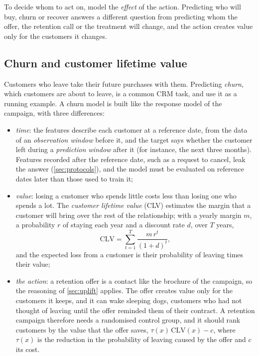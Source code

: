 \begin{keyidea}
To decide whom to act on, model the \emph{effect} of the action. Predicting who will buy, churn or recover
answers a different question from predicting whom the offer, the retention call or the treatment will change, and the action creates value only for the customers it changes.
\end{keyidea}

\subsection{Churn and customer lifetime value\extsec}\label{sec:churn}

Customers who leave take their future purchases with them. Predicting \emph{churn},
which customers are about to leave, is a common CRM task,
and \citet{provost2013data} use it as a running example. A churn model is built like the response model
of the campaign, with three differences:
\begin{itemize}
\item \emph{time}: the features describe each customer at a reference date, from the data of an
\emph{observation window} before it, and the target says whether the customer left during a
\emph{prediction window} after it (for instance, the next three months). Features recorded after the
reference date, such as a request to cancel, leak the answer (\cref{sec:protocols}), and the model must
be evaluated on reference dates later than those used to train it;
\item \emph{value}: losing a customer who spends little costs less than losing one who spends a lot.
The \emph{customer lifetime value} (CLV) estimates the margin that
a customer will bring over the rest of the relationship; with a yearly margin $m$, a probability $r$ of
staying each year and a discount rate $d$, over $T$ years,
\begin{equation}\label{eq:clv}
\mathrm{CLV}=\sum_{t=1}^{T}\frac{m\,r^t}{(1+d)^t},
\end{equation}
and the expected loss from a customer is their probability of leaving times their value;
\item \emph{the action}: a retention offer is a contact like the brochure of the campaign, so the
reasoning of \cref{sec:uplift} applies. The offer creates value only for the customers it keeps, and it
can wake sleeping dogs, customers who had not
thought of leaving until the offer reminded them of their contract. A retention campaign therefore needs
a randomised control group, and it should rank customers by the value that the offer saves,
$\tau(x)\,\mathrm{CLV}(x)-c$, where $\tau(x)$ is the reduction in the probability of leaving caused by
the offer and $c$ its cost.
\end{itemize}

